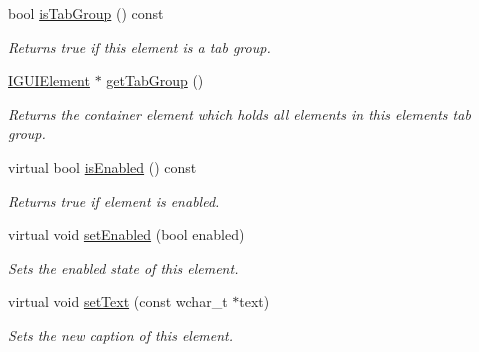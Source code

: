 \begin{DoxyCompactItemize}
bool \hyperlink{classirr_1_1gui_1_1IGUIElement_a70596321725a708ecea4974d4df760c9}{is\+Tab\+Group} () const
\begin{DoxyCompactList}\small\item\em Returns true if this element is a tab group. \end{DoxyCompactList}\item 
\mbox{\label{classirr_1_1gui_1_1IGUIElement_ab6266a2fd3d8b0be385f9f3f3364e9ff}} 
\hyperlink{classirr_1_1gui_1_1IGUIElement}{I\+G\+U\+I\+Element} $\ast$ \hyperlink{classirr_1_1gui_1_1IGUIElement_ab6266a2fd3d8b0be385f9f3f3364e9ff}{get\+Tab\+Group} ()
\begin{DoxyCompactList}\small\item\em Returns the container element which holds all elements in this element\textquotesingle{}s tab group. \end{DoxyCompactList}\item 
virtual bool \hyperlink{classirr_1_1gui_1_1IGUIElement_add00898b0ee96565f55b1b47efaceec6}{is\+Enabled} () const
\begin{DoxyCompactList}\small\item\em Returns true if element is enabled. \end{DoxyCompactList}\item 
\mbox{\label{classirr_1_1gui_1_1IGUIElement_a2e3fd4a5f1ae52296f98cf36fdcffd1b}} 
virtual void \hyperlink{classirr_1_1gui_1_1IGUIElement_a2e3fd4a5f1ae52296f98cf36fdcffd1b}{set\+Enabled} (bool enabled)
\begin{DoxyCompactList}\small\item\em Sets the enabled state of this element. \end{DoxyCompactList}\item 
\mbox{\label{classirr_1_1gui_1_1IGUIElement_a8f864c26d4b2ee3551c53d3ebf870656}} 
virtual void \hyperlink{classirr_1_1gui_1_1IGUIElement_a8f864c26d4b2ee3551c53d3ebf870656}{set\+Text} (const wchar\+\_\+t $\ast$text)
\begin{DoxyCompactList}\small\item\em Sets the new caption of this element. \end{DoxyCompactList}\item 
\mbox{\label{classirr_1_1gui_1_1IGUIElement_addaba768aba8a3e9d77b8ade88f05e13}} 

\end{DoxyCompactItemize}
